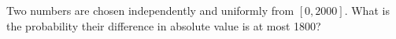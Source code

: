 Two numbers are chosen independently and uniformly from $[0,2000]$. What is the probability their difference in absolute value is at most 1800?
